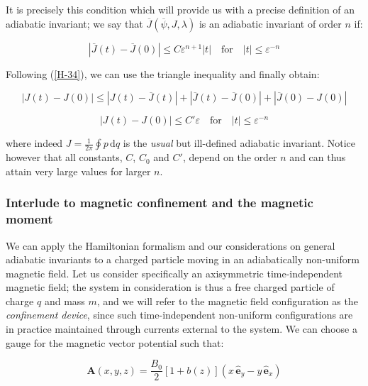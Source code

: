 It is precisely this condition which will provide us with a precise definition of an adiabatic invariant; we say that $\overline{J}(\overline{\psi},J,\lambda)$ is an adiabatic invariant of order $n$ if:

\begin{equation}
    \left|\overline{J}(t)-\overline{J}(0)\right|\leq C \varepsilon^{n+1}\left|t\right|\quad\text{for}\quad \left|t\right|\leq \varepsilon^{-n}
\end{equation}

Following (\ref{H-34}), we can use the triangle inequality and finally obtain:

\begin{equation*}
    \left|J(t)-J(0)\right|\leq \left|J(t)-\overline{J}(t)\right|+\left|\overline{J}(t)-\overline{J}(0)\right|+\left|\overline{J}(0)-J(0)\right|
\end{equation*}

\begin{equation}
    \left|J(t)-J(0)\right|\leq C'\varepsilon\quad\text{for}\quad \left|t\right|\leq \varepsilon^{-n}
\end{equation}

where indeed $J=\frac{1}{2\pi}\oint p\,\mathrm{d}q$ is the \textit{usual} but ill-defined adiabatic invariant. Notice however that all constants, $C$, $C_0$ and $C'$, depend on the order $n$ and can thus attain very large values for larger $n$.

\subsubsection{Interlude to magnetic confinement and the magnetic moment}

We can apply the Hamiltonian formalism and our considerations on general adiabatic invariants to a charged particle moving in an adiabatically non-uniform magnetic field. Let us consider specifically an axisymmetric time-independent magnetic field; the system in consideration is thus a free charged particle of charge $q$ and mass $m$, and we will refer to the magnetic field configuration as the \textit{confinement device}, since such time-independent non-uniform configurations are in practice maintained through currents external to the system. We can choose a gauge for the magnetic vector potential such that:

\begin{equation}
    \mathbf{A}(x,y,z)=\frac{B_0}{2}\left[1+b(z)\right]\left(x\,\mathbf{\hat{e}}_y-y\,\mathbf{\hat{e}}_x\right)
\end{equation}

